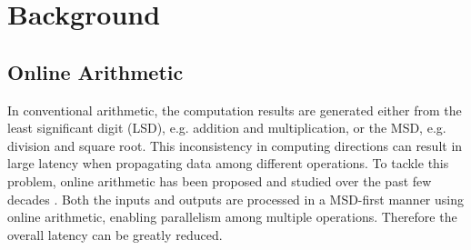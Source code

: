 \documentclass{acm_proc_article-sp}
\begin{document}








\section{Background}
\subsection{Online Arithmetic}
In conventional arithmetic, the computation results are generated either from the least significant digit (LSD), e.g. addition and multiplication, or the MSD, e.g. division and square root. This inconsistency in computing directions can result in large latency when propagating data among different operations. To tackle this problem, online arithmetic has been proposed and studied over the past few decades \cite{Ercegovac_OnlineOverview,Ercegovac_OnlineMult,Online_Trunc}. Both the inputs and outputs are processed in a MSD-first manner using online arithmetic, enabling parallelism among multiple operations. Therefore the overall latency can be greatly reduced.
\end{document}
